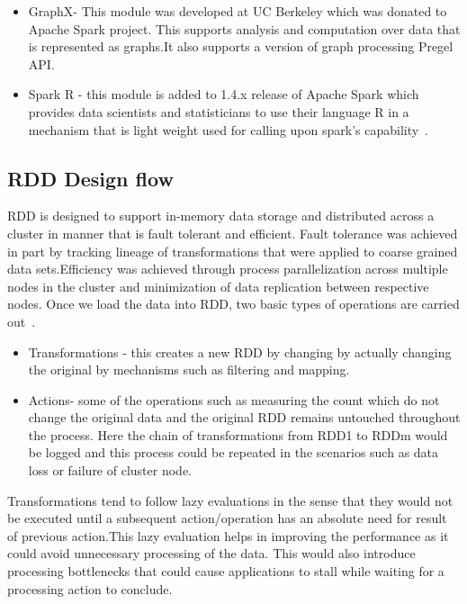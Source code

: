 \begin{itemize}
\item GraphX- This module was developed at UC Berkeley which was donated to Apache 
Spark project. This supports analysis and computation over data that is 
represented as graphs.It also supports a version of graph processing Pregel API.

\item Spark R - this module is added to 1.4.x release of Apache Spark which provides 
data scientists and statisticians to use their language R in a mechanism that is
 light weight used for calling upon spark’s capability~\cite{hid-sp18-410-spark-architecture}.

\end{itemize}


\subsection{RDD Design flow}

RDD is designed to support in-memory data storage and distributed across a 
cluster in manner that is   fault tolerant and efficient. Fault tolerance was 
achieved in part by tracking lineage of transformations that were applied to 
coarse grained data sets.Efficiency was achieved through process parallelization
 across multiple nodes in the cluster and minimization of data replication 
 between respective nodes.
Once we load the data into RDD, two basic types of operations are carried out~\cite{hid-sp18-410-spark-RDD}.

\begin{itemize}

\item Transformations - this creates a new RDD by changing by actually changing the 
original by mechanisms such as filtering and mapping.

\item Actions- some of the operations such as measuring the count which do not change 
the original data and the original RDD remains untouched throughout the process.
 Here the chain of transformations from RDD1 to RDDm would be logged and this 
 process could be repeated in the scenarios such as data loss or failure of 
 cluster node.

\end{itemize}

 Transformations tend to follow lazy evaluations in the sense that they would 
not be executed until a subsequent action/operation has an absolute need for 
result of previous action.This lazy evaluation helps in improving the 
performance as it could avoid unnecessary processing of the data. This would 
also introduce processing bottlenecks that could cause applications to stall 
while waiting for a processing action to conclude.


